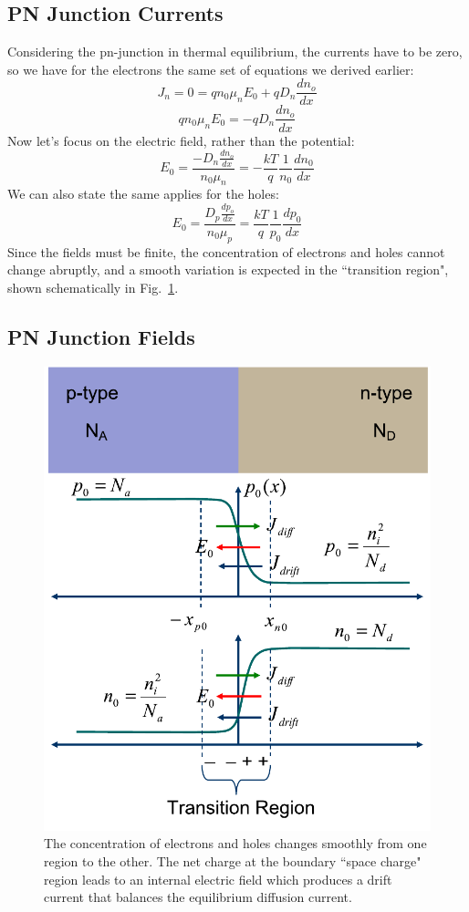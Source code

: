 \subsection{PN Junction Currents}
Considering the pn-junction in thermal equilibrium,  the currents have to be zero, so we have for the electrons the same set of equations we derived earlier:
\begin{equation} 
	{J_n} = 0 = q{n_0}{\mu _n}{E_0} + q{D_n}\frac{{d{n_o}}}{{dx}}
\end{equation}
\begin{equation} 
	q{n_0}{\mu _n}{E_0} =  - q{D_n}\frac{{d{n_o}}}{{dx}} 
\end{equation}
Now let's focus on the electric field, rather than the potential:
\begin{equation} 
	{E_0} = \frac{{ - {D_n}\frac{{d{n_o}}}{{dx}}}}{{{n_0}{\mu _n}}} =  - \frac{{kT}}{q}\frac{1}{{{n_0}}}\frac{{d{n_0}}}{{dx}} 
\end{equation}
We can also state the same applies for the holes:
\begin{equation} 
	{E_0} = \frac{{{D_p}\frac{{d{p_o}}}{{dx}}}}{{{n_0}{\mu _p}}} =   \frac{{kT}}{q}\frac{1}{{{p_0}}}\frac{{d{p_0}}}{{dx}} 
\end{equation}
Since the fields must be finite, the concentration of electrons and holes cannot change abruptly, and a smooth variation is expected in the ``transition region", shown schematically in Fig.~\ref{fig:slide11}.
\subsection{PN Junction Fields}
\begin{figure}[tb]
\begin{center}
\includegraphics[width=.5\columnwidth]{slide11}
\end{center}
\caption{The concentration of electrons and holes changes smoothly from one region to the other.  The net charge at the boundary ``space charge" region leads to an internal electric field which produces a drift current that balances the equilibrium diffusion current.}
\label{fig:slide11}
\end{figure}

